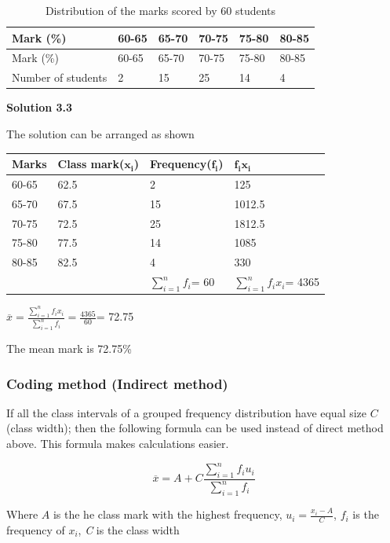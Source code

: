 \documentclass[
]{book}
\begin{document}
\begin{longtable}[]{@{}llllll@{}}
\caption{\label{tab:phy} Distribution of the marks scored by 60 students}\tabularnewline
\toprule
Mark (\%) & 60-65 & 65-70 & 70-75 & 75-80 & 80-85 \\
\midrule
\endfirsthead
\toprule
Mark (\%) & 60-65 & 65-70 & 70-75 & 75-80 & 80-85 \\
\midrule
\endhead
Number of students & 2 & 15 & 25 & 14 & 4 \\
\bottomrule
\end{longtable}

\textbf{Solution 3.3}

The solution can be arranged as shown

\begin{longtable}[]{@{}llll@{}}
\toprule
Marks & Class mark(\(\mathbf{x}_{\mathbf{i}}\)) & Frequency(\(\mathbf{f}_{\mathbf{i}}\)) & \(\mathbf{f}_{\mathbf{i}}\mathbf{x}_{\mathbf{i}}\) \\
\midrule
\endhead
60-65 & 62.5 & 2 & 125 \\
65-70 & 67.5 & 15 & 1012.5 \\
70-75 & 72.5 & 25 & 1812.5 \\
75-80 & 77.5 & 14 & 1085 \\
80-85 & 82.5 & 4 & 330 \\
& & \(\sum_{i = 1}^{n}f_{i}\)= 60 & \(\sum_{i = 1}^{n}{f_{i}x_{i}}\)= 4365 \\
\bottomrule
\end{longtable}

\(\overline{x} = \frac{\sum_{i = 1}^{n}{f_{i}x_{i}}}{\sum_{i = 1}^{n}f_{i}} = \frac{4365}{60}\)=
72.75

The mean mark is 72.75\%

\hypertarget{coding-method-indirect-method}{%
\subsubsection{Coding method (Indirect method)}\label{coding-method-indirect-method}}

If all the class intervals of a grouped frequency distribution have equal size \(C\) (class width); then the following formula can be used instead of direct method above. This formula makes calculations easier.

\[\overline{x} = A + C\frac{\sum_{i = 1}^{n}{f_{i}u_{i}}}{\sum_{i = 1}^{n}f_{i}}\]

Where \(A\) is the he class mark with the highest frequency,
\(u_{i} = \frac{x_{i} - A}{C}\), \(f_{i}\) is the frequency of \(x_{i}\), \emph{C}
is the class width
\end{document}
